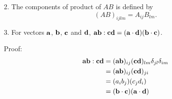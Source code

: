 2. The components of product of $AB$ is defined by 
\begin{equation}
    (AB)_{ijlm}=A_{ij}B_{lm}.
\label{tensor_product}
\end{equation}

3. For vectors $\bf{a}$, $\bf{b}$, $\bf{c}$ and $\bf{d}$, ${\bf{ab}}:{\bf{cd}}=({\bf{a}}\cdot {\bf{d}})({\bf{b}}\cdot{\bf{c}})$.

Proof:
\begin{align}
    {\bf{ab}}:{\bf{cd}}&=({\bf{ab}})_{ij}({\bf{cd}})_{lm}\delta_{jl}\delta_{im} \nonumber \\
    &=({\bf{ab}})_{ij}({\bf{cd}})_{ji} \nonumber\\
    &=(a_i b_j)(c_j d_i) \nonumber\\
    &=({\bf{b}}\cdot{\bf{c}})({\bf{a}}\cdot{\bf{d}})
\end{align}

